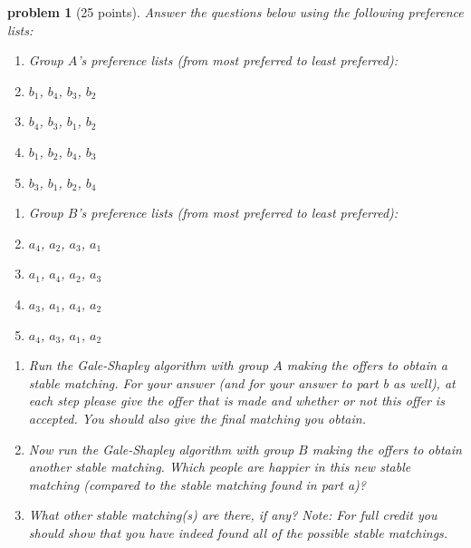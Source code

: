 \documentclass[10pt]{article}
\newtheorem{problem}{\sc\color{cit}problem}
\begin{document}
\newpage
\begin{problem}[25 points]
 Answer the questions below using the following preference lists:

 \begin{enumerate}
 \item[] Group $A$'s preference lists (from most preferred to least preferred):
 \item[$a_1$:] $b_1$, $b_4$, $b_3$, $b_2$
 \item[$a_2$:] $b_4$, $b_3$, $b_1$, $b_2$
 \item[$a_3$:] $b_1$, $b_2$, $b_4$, $b_3$
 \item[$a_4$:] $b_3$, $b_1$, $b_2$, $b_4$
 \end{enumerate}

 \begin{enumerate}
 \item[]  Group $B$'s preference lists (from most preferred to least preferred):
 \item[$b_1$:] $a_4$, $a_2$, $a_3$, $a_1$
 \item[$b_2$:] $a_1$, $a_4$, $a_2$, $a_3$
 \item[$b_3$:] $a_3$, $a_1$, $a_4$, $a_2$
 \item[$b_4$:] $a_4$, $a_3$, $a_1$, $a_2$
 \end{enumerate}

\begin{enumerate}
    \item[(a)] Run the Gale-Shapley algorithm with group $A$ making the offers to obtain a stable matching. For your answer (and for your answer to part b as well), at each step please give the offer that is made and whether or not this offer is accepted. You should also give the final matching you obtain.
    \item[(b)] Now run the Gale-Shapley algorithm with group $B$ making the offers to obtain another stable matching. Which people are happier in this new stable matching (compared to the stable matching found in part a)?
    \item[(c)] What other stable matching(s) are there, if any? Note: For full credit you should show that you have indeed found all of the possible stable matchings.
    \end{enumerate}
\end{problem}
\end{document}
